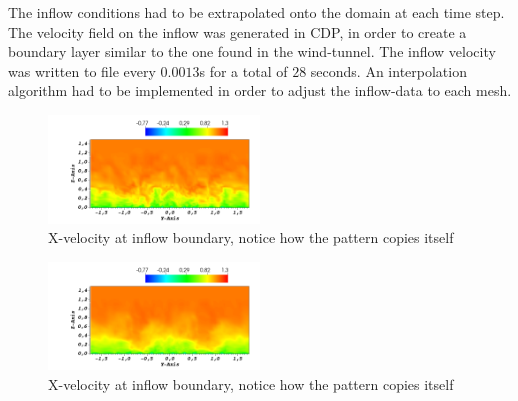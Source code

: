 The inflow conditions had to be extrapolated onto the domain at each time step. The velocity field
on the inflow was generated in CDP, in order to create a boundary layer similar to the one found
in the wind-tunnel. The inflow velocity was written to file every 
$0.0013$s for a total of $28$ seconds. An interpolation algorithm had to be implemented in order
to adjust the inflow-data to each mesh. 
%
\begin{figure}[h]
	\includegraphics[width=0.5\textwidth]{Figures/inflow_field.png}
	\caption{X-velocity at inflow boundary, notice how the pattern copies itself}
	\label{fig:layout}
\end{figure}
%
\begin{figure}[h]
	\includegraphics[width=0.5\textwidth]{Figures/inflow_field_avg.png}
	\caption{X-velocity at inflow boundary, notice how the pattern copies itself}
	\label{fig:layout}
\end{figure}
%
